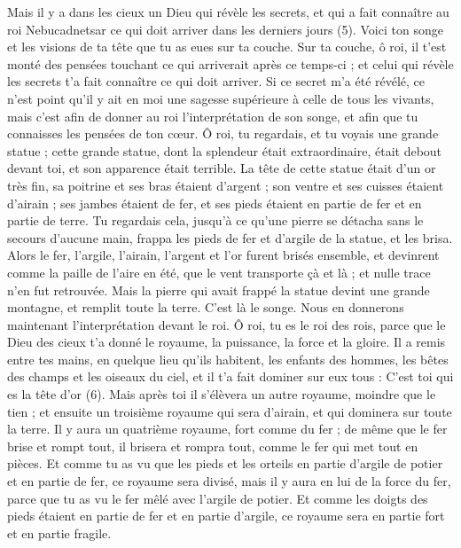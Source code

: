 \begin{multicols}{2}
Mais il y a dans les cieux un Dieu qui révèle les secrets, et qui a fait connaître au roi Nebucadnetsar ce qui doit arriver dans les derniers jours (5). Voici ton songe et les visions de ta tête que tu as eues sur ta couche.
Sur ta couche, ô roi, il t’est monté des pensées touchant ce qui arriverait après ce temps-ci ; et celui qui révèle les secrets t'a fait connaître ce qui doit arriver.
Si ce secret m'a été révélé, ce n’est point qu’il y ait en moi une sagesse supérieure à celle de tous les vivants, mais c’est afin de donner au roi l'interprétation de son songe, et afin que tu connaisses les pensées de ton cœur.
Ô roi, tu regardais, et tu voyais une grande statue ; cette grande statue, dont la splendeur était extraordinaire, était debout devant toi, et son apparence était terrible.
La tête de cette statue était d'un or très fin, sa poitrine et ses bras étaient d'argent ; son ventre et ses cuisses étaient d'airain ;
ses jambes étaient de fer, et ses pieds étaient en partie de fer et en partie de terre.
Tu regardais cela, jusqu’à ce qu’une pierre se détacha sans le secours d’aucune main, frappa les pieds de fer et d’argile de la statue, et les brisa.
Alors le fer, l’argile, l'airain, l'argent et l'or furent brisés ensemble, et devinrent comme la paille de l'aire en été, que le vent transporte çà et là ; et nulle trace n’en fut retrouvée.  Mais la pierre qui avait frappé la statue devint une grande montagne, et remplit toute la terre.
C'est là le songe. Nous en donnerons maintenant l’interprétation devant le roi.
Ô roi, tu es le roi des rois, parce que le Dieu des cieux t'a donné le royaume, la puissance, la force et la gloire.
Il a remis entre tes mains, en quelque lieu qu’ils habitent, les enfants des hommes, les bêtes des champs et les oiseaux du ciel, et il t’a fait dominer sur eux tous : C’est toi qui es la tête d'or (6).
Mais après toi il s'élèvera un autre royaume, moindre que le tien ; et ensuite un troisième royaume qui sera d'airain, et qui dominera sur toute la terre.
Il y aura un quatrième royaume, fort comme du fer ; de même que le fer brise et rompt tout, il brisera et rompra tout, comme le fer qui met tout en pièces.
Et comme tu as vu que les pieds et les orteils en partie d’argile de potier et en partie de fer, ce royaume sera divisé, mais il y aura en lui de la force du fer, parce que tu as vu le fer mêlé avec l’argile de potier.
Et comme les doigts des pieds étaient en partie de fer et en partie d’argile, ce royaume sera en partie fort et en partie fragile.

\end{multicols}
